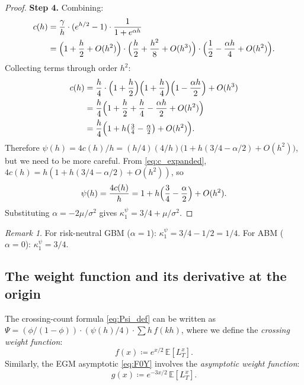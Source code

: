 \documentclass[11pt]{article}
\theoremstyle{definition}
\theoremstyle{remark}
\newtheorem{remark}[theorem]{Remark}
\newcommand{\E}{\mathbb{E}}
\begin{document}
\begin{proof}
\textbf{Step 4.} Combining:
\begin{align}
c(h) &= \frac{\gamma}{h} \cdot (e^{h/2} - 1)
\cdot \frac{1}{1 + e^{\alpha h}} \notag \\
&= \Bigl(1 + \frac{h}{2} + O(h^2)\Bigr)
\cdot \Bigl(\frac{h}{2} + \frac{h^2}{8} + O(h^3)\Bigr)
\cdot \Bigl(\frac{1}{2} - \frac{\alpha h}{4} + O(h^2)\Bigr).
\label{eq:c_product}
\end{align}
Collecting terms through order $h^2$:
\begin{align}
c(h) &= \frac{h}{4} \cdot
\Bigl(1 + \frac{h}{2}\Bigr)
\Bigl(1 + \frac{h}{4}\Bigr)
\Bigl(1 - \frac{\alpha h}{2}\Bigr) + O(h^3)
\notag \\
&= \frac{h}{4}\Bigl(1 + \frac{h}{2} + \frac{h}{4}
- \frac{\alpha h}{2} + O(h^2)\Bigr) \notag \\
&= \frac{h}{4}\Bigl(1 + h\bigl(\tfrac{3}{4}
- \tfrac{\alpha}{2}\bigr) + O(h^2)\Bigr).
\label{eq:c_expanded}
\end{align}
Therefore $\psi(h) = 4c(h)/h = (h/4)(4/h)\bigl(1 + h(3/4 - \alpha/2)
+ O(h^2)\bigr)$, but we need to be more careful. From
\eqref{eq:c_expanded}, $4c(h) = h(1 + h(3/4 - \alpha/2) + O(h^2))$,
so
\[
\psi(h) = \frac{4c(h)}{h}
= 1 + h\Bigl(\frac{3}{4} - \frac{\alpha}{2}\Bigr) + O(h^2).
\]
Substituting $\alpha = -2\mu/\sigma^2$ gives
$\kappa_1^{\psi} = 3/4 + \mu/\sigma^2$.
\end{proof}

\begin{remark}\label{rem:gbm_prefactor}
For risk-neutral GBM ($\alpha = 1$):
$\kappa_1^{\psi} = 3/4 - 1/2 = 1/4$. For ABM ($\alpha = 0$):
$\kappa_1^{\psi} = 3/4$.
\end{remark}

\subsection{The weight function and its derivative at the origin}

The crossing-count formula \eqref{eq:Psi_def} can be written as
$\Psi = (\phi/(1{-}\phi)) \cdot (\psi(h)/4) \cdot \sum h\,f(kh)$,
where we define the \emph{crossing weight function}:
\begin{equation}\label{eq:f_def}
f(x) \coloneqq e^{x/2}\,\E[L^x_T].
\end{equation}
Similarly, the EGM asymptotic \eqref{eq:F0Y} involves the
\emph{asymptotic weight function}:
\begin{equation}\label{eq:g_def}
g(x) \coloneqq e^{-3x/2}\,\E[L^x_T].
\end{equation}
\end{document}
